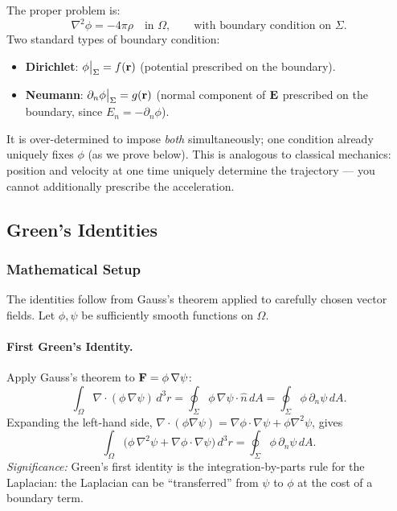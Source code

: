 The proper problem is:
\begin{equation}\label{eq:lec12:bvp}
  \nabla^2\phi = -4\pi\rho
  \quad\text{in } \Omega ,
  \qquad
  \text{with boundary condition on } \Sigma .
\end{equation}
Two standard types of boundary condition:
\begin{itemize}
  \item \textbf{Dirichlet}: $\phi\big|_\Sigma = f(\mathbf{r})$ (potential prescribed on the boundary).
  \item \textbf{Neumann}: $\partial_n\phi\big|_\Sigma = g(\mathbf{r})$ (normal component of $\mathbf{E}$
        prescribed on the boundary, since $E_n = -\partial_n\phi$).
\end{itemize}
It is over-determined to impose \emph{both} simultaneously; one condition already uniquely
fixes $\phi$ (as we prove below).  This is analogous to classical mechanics: position and
velocity at one time uniquely determine the trajectory — you cannot additionally prescribe
the acceleration.

\subsection{Green's Identities}\label{subsec:lec12-green-identities}

\subsubsection*{Mathematical Setup}
The identities follow from Gauss's theorem applied to carefully chosen vector fields.
Let $\phi, \psi$ be sufficiently smooth functions on $\Omega$.

\paragraph{First Green's Identity.}
Apply Gauss's theorem to $\mathbf{F} = \phi\,\nabla\psi$:
\begin{equation}\label{eq:lec12:gauss-phi-grad-psi}
  \int_\Omega \nabla\cdot(\phi\,\nabla\psi)\,d^3r
  =
  \oint_\Sigma \phi\,\nabla\psi\cdot\hat{n}\,dA
  =
  \oint_\Sigma \phi\,\partial_n\psi\,dA .
\end{equation}
Expanding the left-hand side,
$\nabla\cdot(\phi\nabla\psi) = \nabla\phi\cdot\nabla\psi + \phi\nabla^2\psi$, gives
\begin{equation}\label{eq:lec12:green1}
  \boxed{
    \int_\Omega \!\!\bigl(\phi\,\nabla^2\psi + \nabla\phi\cdot\nabla\psi\bigr)\,d^3r
    =
    \oint_\Sigma \phi\,\partial_n\psi\,dA .
  }
\end{equation}
\textit{Significance:} Green's first identity is the integration-by-parts rule for the
Laplacian: the Laplacian can be ``transferred'' from $\psi$ to $\phi$ at the cost of a
boundary term.

